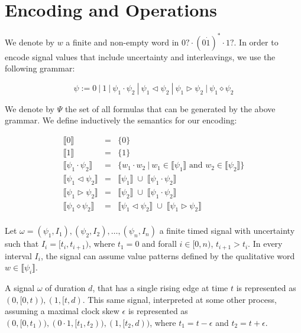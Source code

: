 \section{Encoding and Operations}


We denote by $w$ a finite and non-empty word in $0? \cdot (0\dot 1)^{*} \cdot 1?$. In order to encode signal values that include uncertainty and interleavings, we use the following grammar:

$$
\psi := 0~|~1~|~\psi_1 \cdot \psi_2~|~\psi_1 \triangleleft \psi_2~|~\psi_1 \triangleright \psi_2~|~\psi_1 \diamond \psi_2
$$

We denote by $\Psi$ the set of all formulas that can be generated by the above grammar. We define inductively the semantics for our encoding:

\begin{equation}
\begin{array}{lcl}
\llbracket 0 \rrbracket & = & \{ 0 \} \\
\llbracket 1 \rrbracket & = & \{ 1 \} \\
\llbracket \psi_1 \cdot \psi_2 \rrbracket & = & \{ w_1 \cdot w_2~|~w_1 \in \llbracket \psi_1 \rrbracket \text{ and } w_2 \in \llbracket \psi_2 \rrbracket \} \\
\llbracket \psi_1 \triangleleft \psi_2 \rrbracket & = & \llbracket \psi_1 \rrbracket \; \cup \;  \llbracket \psi_1 \cdot \psi_2 \rrbracket \\
\llbracket \psi_1 \triangleright \psi_2 \rrbracket & = & \llbracket \psi_2 \rrbracket \; \cup \;  \llbracket \psi_1 \cdot \psi_2 \rrbracket \\
\llbracket \psi_1 \diamond \psi_2 \rrbracket & = & \llbracket \psi_1 \triangleleft \psi_2 \rrbracket \; \cup \; \llbracket \psi_1 \triangleright \psi_2 \rrbracket\\
\end{array}
\end{equation}

Let $\omega = (\psi_1, I_1), (\psi_2, I_2), \ldots , (\psi_n, I_n)$ a finite timed signal with uncertainty such that $I_i = [t_i, t_{i+1})$, where $t_1 = 0$ and forall $i \in [0,n)$, $t_{i+1} > t_i$. In every interval $I_i$, the signal can assume value patterns defined by the qualitative word $w \in \llbracket \psi_i \rrbracket$.

\begin{example}
A signal $\omega$ of duration $d$, that has a single rising edge at time $t$ is represented as $(0, [0, t)), (1, [t, d)$. This same signal, interpreted at some other process, assuming a maximal clock skew $\epsilon$ is represented as $(0, [0, t_1)), (0\cdot 1, [t_1, t_2)), (1, [t_2, d))$, where $t_1 = t - \epsilon$ and $t_2 = t + \epsilon$.
\end{example}

